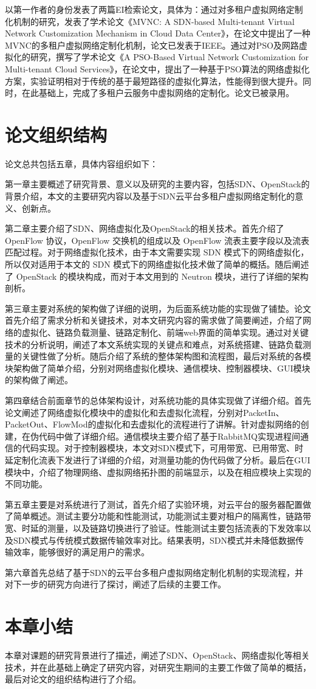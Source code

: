 以第一作者的身份发表了两篇EI检索论文，具体为：通过对多租户虚拟网络定制化机制的研究，发表了学术论文《MVNC: A SDN-based Multi-tenant Virtual Network Customization Mechanism in Cloud Data Center》，在论文中提出了一种MVNC的多租户虚拟网络定制化机制，论文已发表于IEEE。通过对\gls*{PSO}及网路虚拟化的研究，撰写了学术论文《A PSO-Based Virtual Network Customization for Multi-tenant Cloud Services》，在论文中，提出了一种基于PSO算法的网络虚拟化方案，实验证明相对于传统的基于最短路径的虚拟化算法，性能得到很大提升。同时，在此基础上，完成了多租户云服务中虚拟网络的定制化。论文已被录用。
\section{论文组织结构}
论文总共包括五章，具体内容组织如下：

第一章主要概述了研究背景、意义以及研究的主要内容，包括SDN、OpenStack的背景介绍，本文的主要研究内容以及基于SDN云平台多租户虚拟网络定制化的意义、创新点。

第二章主要介绍了SDN、网络虚拟化及OpenStack的相关技术。首先介绍了OpenFlow 协议，OpenFlow 交换机的组成以及 OpenFlow 流表主要字段以及流表匹配过程。对于网络虚拟化技术，由于本文需要实现 SDN 模式下的网络虚拟化，所以仅对适用于本文的 SDN 模式下的网络虚拟化技术做了简单的概括。随后阐述了 OpenStack 的模块构成，而对于本文用到的 Neutron 模块，进行了详细的架构剖析。

第三章主要对系统的架构做了详细的说明，为后面系统功能的实现做了铺垫。论文首先介绍了需求分析和关键技术，对本文研究内容的需求做了简要阐述，介绍了网络的虚拟化、链路负载测量、链路定制化、前端web界面的简单实现。通过对关键技术的分析说明，阐述了本文系统实现的关键点和难点，对系统搭建、链路负载测量的关键性做了分析。随后介绍了系统的整体架构图和流程图，最后对系统的各模块架构做了简单介绍，分别对网络虚拟化模块、通信模块、控制器模块、GUI模块的架构做了阐述。

第四章结合前面章节的总体架构设计，对系统功能的具体实现做了详细介绍。首先论文阐述了网络虚拟化模块中的虚拟化和去虚拟化流程，分别对PacketIn、PacketOut、FlowMod的虚拟化和去虚拟化的流程进行了讲解。针对虚拟网络的创建，在伪代码中做了详细介绍。通信模块主要介绍了基于RabbitMQ实现进程间通信的代码实现。对于控制器模块，本文对SDN模式下，可用带宽、已用带宽、时延定制化流表下发进行了详细的介绍，对测量功能的伪代码做了分析。最后在GUI模块中，介绍了物理网络、虚拟网络拓扑图的前端显示，以及在相应模块上实现的不同功能。

第五章主要是对系统进行了测试，首先介绍了实验环境，对云平台的服务器配置做了简单概述。测试主要分功能和性能测试，功能测试主要对租户的隔离性，链路带宽、时延的测量，以及链路切换进行了验证。性能测试主要包括流表的下发效率以及SDN模式与传统模式数据传输效率对比。结果表明，SDN模式并未降低数据传输效率，能够很好的满足用户的需求。

第六章首先总结了基于SDN的云平台多租户虚拟网络定制化机制的实现流程，并对下一步的研究方向进行了探讨，阐述了后续的主要工作。

\section{本章小结}
本章对课题的研究背景进行了描述，阐述了SDN、OpenStack、网络虚拟化等相关技术，并在此基础上确定了研究内容，对研究生期间的主要工作做了简单的概括，最后对论文的组织结构进行了介绍。